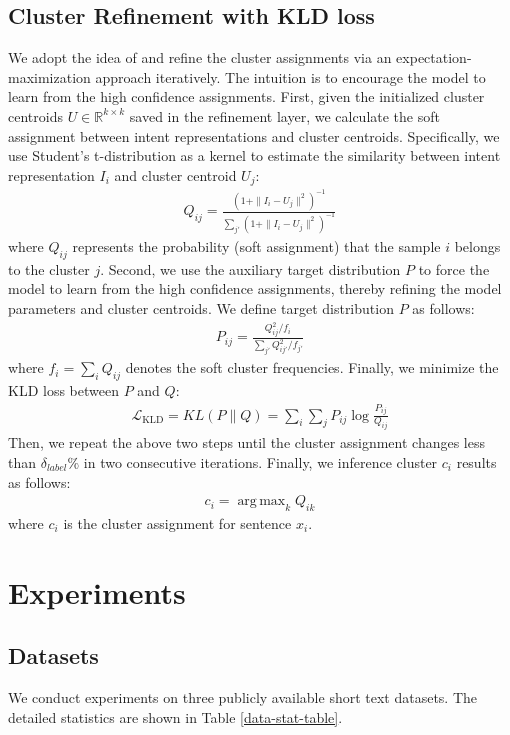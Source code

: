 \documentclass[letterpaper]{article} \usepackage{aaai20}  \usepackage{times}  \usepackage{helvet} \usepackage{courier}  \usepackage[hyphens]{url}  \usepackage{graphicx} \urlstyle{rm} \def\UrlFont{\rm}  \usepackage{graphicx}  \frenchspacing  \setlength{\pdfpagewidth}{8.5in}  \setlength{\pdfpageheight}{11in}
\newcommand{\citet}[1]{\citeauthor{#1} \shortcite{#1}}
\DeclareMathOperator*{\argmax}{arg\,max}
\begin{document}
\subsection{Cluster Refinement with KLD loss}
We adopt the idea of \citet{xie2016unsupervised} and refine the cluster assignments via an expectation-maximization approach iteratively. The intuition is to encourage the model to learn from the high confidence assignments. First, given the initialized cluster centroids $U  \in \mathds R^{k \times k}$ saved in the refinement layer, we calculate the soft assignment between intent representations and cluster centroids. Specifically, we use Student’s t-distribution as a kernel to estimate the similarity between intent representation $I_i$ and cluster centroid $U_j$:
\begin{align}
    Q_{ij} = \frac{(1+ \parallel I_i - U_j \parallel ^2)^{-1}}{\sum_{j'}(1+ \parallel I_i - U_j \parallel ^2)^{-1}} 
\end{align}
where $Q_{ij}$ represents the probability (soft assignment) that the sample $i$ belongs to the cluster $j$. Second, we use the auxiliary target distribution $P$ to force the model to learn from the high confidence assignments, thereby refining the model parameters and cluster centroids. We define target distribution $P$ as follows:
\begin{align}
    P_{ij} = \frac{Q^2_{ij}/f_i}{\sum_{j'} Q^2_{ij'}/f_{j'}}
\end{align}
where $f_i = \sum_i Q_{ij}$ denotes the soft cluster frequencies. Finally, we minimize the KLD loss between $P$ and $Q$:
\begin{align}
    \mathcal{L}_{\text{KLD}} = KL(P\|Q) = \sum_i \sum_j P_{ij} \log \frac{P_{ij}}{Q_{ij}} 
\end{align}
Then, we repeat the above two steps until the cluster assignment changes less than $\delta_{label} \%$ in two consecutive iterations. Finally, we inference cluster $c_i$ results as follows:
\begin{align}
    c_i = \argmax_{k} Q_{ik}
\end{align}
where $c_i$ is the cluster assignment for sentence $x_i$.


\section{Experiments}
\subsection{Datasets}
We conduct experiments on three publicly available short text datasets. The detailed statistics are shown in Table \ref{data-stat-table}.
\end{document}
